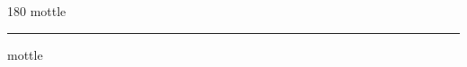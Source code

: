 
\begin{frame}
\begin{center}
\begin{turn}{180}
{\fontsize{2.5cm}{1em}\selectfont mottle}
\end{turn}
\vspace{1em}\par  
\hrule
\vspace{1em}\par  
{\fontsize{2.5cm}{1em}\selectfont mottle}
\end{center}
\end{frame}
